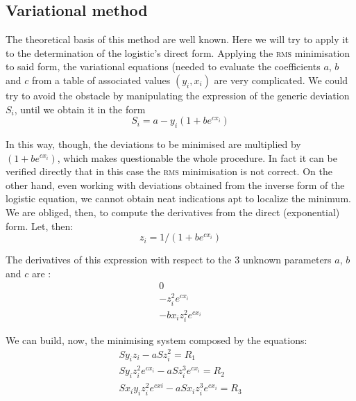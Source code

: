 \documentclass[%
 aip,
 jmp,%
 amsmath,amssymb,
 reprint,%
]{revtex4-1}
\begin{document}
\subsection{\label{sec:level2}Variational method}

The theoretical basis of this method are well known. Here we will try to apply it to the determination of the logistic's direct form. Applying the \textsc{rms} minimisation to said form, the variational equations (needed  to evaluate the coefficients $a$, $b$ and $c$ from a table of associated values $(y_i, x_i)$  are very complicated.
We could try to avoid the obstacle by manipulating the expression of the generic deviation $S_i$, until we obtain it in the form
 \[S_i = a - y_i (1 + b e^{cx_i}) \]

In this way, though, the deviations to be minimised are multiplied by $(1 + b e^{cx_i})$, which makes questionable the whole procedure. In fact it can be verified directly that in this case the \textsc{rms} minimisation is not correct. On the other hand, even working with deviations obtained from the inverse form of the logistic equation, we cannot obtain neat indications apt to localize the minimum. We are obliged, then, to compute the derivatives from the  direct (exponential) form.
Let, then:
\[z_i = 1 / (1 + b e^{cx_i})\]

The derivatives of this expression with respect to the 3 unknown parameters $a$, $b$ and $c$ are :
\begin{eqnarray*}
0  \\
-z_i^2 e^{c x_i} \\
-b x_i z_i^2 e^{c x_i}
\end{eqnarray*}

We can build, now, the minimising system composed by the equations:
\begin{eqnarray*}
	S y_i z_i - a S z_i^2 = R_1 \\
	S y_i z_i^2 e^{c x_i} - a S z_i^3 e^{c x_i} = R_2 \\
	S x_i y_i z_i^2 e^{c xi} - a S x_i z_i^3 e^{c x_i} = R_3
\end{eqnarray*}
\end{document}
